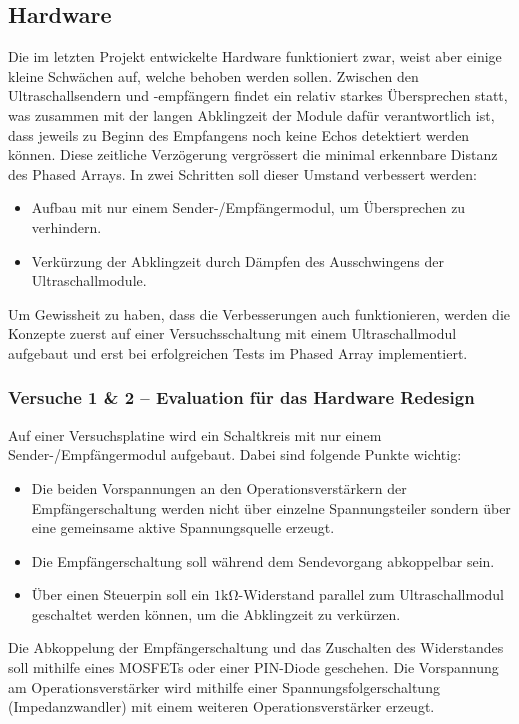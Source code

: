 \documentclass[10pt,a4paper,oneside]{99_fhnwreport}
\begin{document}
\subsection*{Hardware}
Die im letzten Projekt entwickelte Hardware funktioniert zwar, weist aber einige kleine Schwächen auf, welche behoben werden sollen. Zwischen den Ultraschallsendern und -empfängern findet ein relativ starkes Übersprechen statt, was zusammen mit der langen Abklingzeit der Module dafür verantwortlich ist, dass jeweils zu Beginn des Empfangens noch keine Echos detektiert werden können. Diese zeitliche Verzögerung vergrössert die minimal erkennbare Distanz des Phased Arrays. In zwei Schritten soll dieser Umstand verbessert werden:

\begin{itemize}
	\item Aufbau mit nur einem Sender-/Empfängermodul, um Übersprechen zu verhindern.
	\item Verkürzung der Abklingzeit durch Dämpfen des Ausschwingens der Ultraschallmodule.
\end{itemize}

Um Gewissheit zu haben, dass die Verbesserungen auch funktionieren, werden die Konzepte zuerst auf einer Versuchsschaltung mit einem Ultraschallmodul aufgebaut und erst bei erfolgreichen Tests im Phased Array implementiert.

\subsubsection*{Versuche 1 \& 2 -- Evaluation für das Hardware Redesign}
Auf einer Versuchsplatine wird ein Schaltkreis mit nur einem Sender-/Empfängermodul aufgebaut. Dabei sind folgende Punkte wichtig:

\begin{itemize}
	\item Die beiden Vorspannungen an den Operationsverstärkern der Empfängerschaltung werden nicht über einzelne Spannungsteiler sondern über eine gemeinsame aktive Spannungsquelle erzeugt.
	\item Die Empfängerschaltung soll während dem Sendevorgang abkoppelbar sein.
	\item Über einen Steuerpin soll ein $1 \mathrm{k\Omega}$-Widerstand parallel zum Ultraschallmodul geschaltet werden können, um die Abklingzeit zu verkürzen.
\end{itemize}

Die Abkoppelung der Empfängerschaltung und das Zuschalten des Widerstandes soll mithilfe eines MOSFETs oder einer PIN-Diode geschehen. Die Vorspannung am Operationsverstärker wird mithilfe einer Spannungsfolgerschaltung (Impedanzwandler) mit einem weiteren Operationsverstärker erzeugt.
\end{document}
